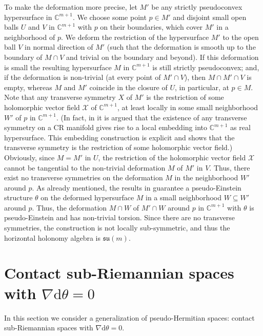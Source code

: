 \documentclass{amsart}
\theoremstyle{plain}
\theoremstyle{definition}
\def\su{\mathfrak{su}}
\newcommand{\1}{\mathbf{1}}
\renewcommand{\d}{\mathrm{d}}
\newcommand{\+}{\oplus}
\newcommand{\tcom}[1]{
 \marginpar{{\scriptsize  T: #1 }}}
\newcommand{\acom}[1]{
 \marginpar{{\scriptsize A: #1 }}}
\begin{document}
To make the deformation more precise, let $M'$ be any strictly pseudoconvex hypersurface in $\mathbb{C}^{m+1}$.
We choose some point $p\in M'$ and disjoint small open balls $U$ and $V$ in $\mathbb{C}^{m+1}$ with $p$ on their 
boundaries, which cover $M'$ in a neighborhood of $p$. We deform the restriction of the hypersurface $M'$ to the 
open ball  $V$ in normal direction 
of $M'$ (such that the deformation is smooth up to the boundary 
of  $M\cap V$ and trivial on the boundary and beyond).
If this deformation is small 
the resulting hypersurface $M$ in $\mathbb{C}^{m+1}$ is 
still strictly  pseudoconvex; and, if the deformation 
is non-trivial (at every point 
of $M'\cap V$), then $M\cap M'\cap V$ is empty, whereas $M$ and $M'$ coincide in the closure of  $U$,
in particular, at $p\in M$.  Note that any transverse symmetry $X$ of $M'$ is  
the restriction of some holomorphic vector field $\mathcal{X}$ of $\mathbb{C}^{m+1}$, at least locally in some small neighborhood $W'$
of $p$ in $\mathbb{C}^{m+1}$. 
(In fact, in \cite{Jac} it is argued that the existence of any transverse
symmetry on a CR manifold gives rise to a local embedding into  $\mathbb{C}^{m+1}$ as real hypersurface. This embedding 
construction is explicit and shows
that the transverse symmetry is the restriction of some 
holomorphic vector field.)
Obviously, since $M=M'$ in $U$, the restriction of the holomorphic vector field $\mathcal{X}$ cannot be tangential to the non-trivial deformation  $M$
of $M'$ in $V$. Thus, there exist no transverse symmetries on the deformation $M$ in the neighborhood $W'$ around $p$.
As already mentioned, the results in \cite{Lee} 
guarantee  a pseudo-Einstein structure $\theta$ 
on the deformed hypersurface $M$ in a small neighborhood $W\subseteq W'$ around 
$p$. Thus, 
the deformation $M\cap W$ of $M'\cap W$ around $p$ in $\mathbb{C}^{m+1}$
with $\theta$ is pseudo-Einstein and has non-trivial torsion.
Since there are no transverse symmetries, the construction 
is not locally sub-symmetric, and thus the  horizontal holonomy algebra is $\su(m)$.   



\section{Contact sub-Riemannian spaces with $\nabla\d\theta =0$}\label{secparaldtheta}

In this section we consider a generalization of pseudo-Hermitian  spaces: contact sub-Riemannian spaces with $\nabla\d\theta =0$. 
\end{document}
